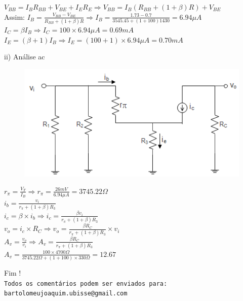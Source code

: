 \documentclass[11pt,a4paper,twoside]{report}
\begin{document}
\begin{enumerate}
\begin{minipage}[c]{12cm}
{$V_{BB}=I_BR_{BB}+V_{BE}+I_ER_E\Longrightarrow V_{BB}=I_B\left( R_{BB}+(1+\beta)R\right)+ V_{BE}$\\

Assim: $I_B=\frac{V_{BB}-V_{BE}}{R_{BB}+(1+\beta)R}\Longrightarrow I_B=\frac{1.73-0.7}{3545.45+(1+100)1430}=6.94\mu A$\\

$I_C=\beta I_B\Longrightarrow I_C=100\times 6.94\mu A =0.69 mA$\\

$I_E=(\beta +1)I_B \Longrightarrow I_E=(100 +1)\times6.94\mu A= 0.70mA$
}
\end{minipage}

\hrulefill

ii) An\'alise ac

\noindent
\begin{minipage}[c]{5cm}
\begin{figure}[H]
\centering
\includegraphics[scale=0.65]{analiseac}
\caption{}
\label{f4}
\end{figure}
\end{minipage}\hfill
\begin{minipage}[c]{8cm}
{$r_{\pi}=\frac{V_T}{I_B}\Longrightarrow r_{\pi}=\frac{26mV}{6.94\mu A}=3745.22\Omega
 $\\

$i_b=\frac{v_i}{r_{\pi}+(1+\beta)R_3}$\\

$i_c=\beta \times i_b\Longrightarrow i_c=\frac{\beta v_i}{r_{\pi}+(1+\beta)R_3}$\\

$v_o=i_c\times R_C\Longrightarrow v_o=\frac{\beta R_C }{r_{\pi}+(1+\beta)R_3}\times v_i$\\

$A_v=\frac{v_o}{v_i}\Longrightarrow A_v=\frac{\beta R_C }{r_{\pi}+(1+\beta)R_3}$\\

$ A_v=\frac{100\times4700\Omega}{3745.22\Omega+(1+100)\times 330\Omega}=12.67$\\
}
\end{minipage}
\end{enumerate}
\vspace{2cm}
\Huge{Fim !}\\
\vspace{4cm}
\normalsize
\tt Todos os coment\'arios podem ser enviados para:\\
\color{blue}bartolomeujoaquim.ubisse@gmail.com
\end{document}
